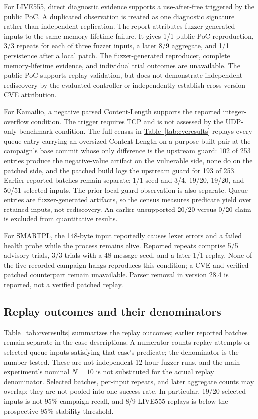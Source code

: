 \documentclass[final,5p,times,number]{elsarticle}
\newcommand{\namedref}[2]{\hyperref[#2]{#1~\ref*{#2}}}
\begin{document}
For LIVE555, direct diagnostic evidence supports a use-after-free triggered by the public PoC. A duplicated observation is treated as one diagnostic signature rather than independent replication. The report attributes fuzzer-generated inputs to the same memory-lifetime failure. It gives 1/1 public-PoC reproduction, 3/3 repeats for each of three fuzzer inputs, a later 8/9 aggregate, and 1/1 persistence after a local patch. The fuzzer-generated reproducer, complete memory-lifetime evidence, and individual trial outcomes are unavailable. The public PoC supports replay validation, but does not demonstrate independent rediscovery by the evaluated controller or independently establish cross-version CVE attribution.

For Kamailio, a negative parsed Content-Length supports the reported integer-overflow condition. The trigger requires TCP and is not assessed by the UDP-only benchmark condition. The full census in \namedref{Table}{tab:cveresults} replays every queue entry carrying an oversized Content-Length on a purpose-built pair at the campaign's base commit whose only difference is the upstream guard: 102 of 253 entries produce the negative-value artifact on the vulnerable side, none do on the patched side, and the patched build logs the upstream guard for 193 of 253. Earlier reported batches remain separate: 1/1 seed and 3/4, 19/20, 19/20, and 50/51 selected inputs. The prior local-guard observation is also separate. Queue entries are fuzzer-generated artifacts, so the census measures predicate yield over retained inputs, not rediscovery. An earlier unsupported 20/20 versus 0/20 claim is excluded from quantitative results. 

For SMARTPL, the 148-byte input reportedly causes lexer errors and a failed health probe while the process remains alive. Reported repeats comprise 5/5 advisory trials, 3/3 trials with a 48-message seed, and a later 1/1 replay. None of the five recorded campaign hangs reproduces this condition; a CVE and verified patched counterpart remain unavailable. Parser removal in version 28.4 is reported, not a verified patched replay.

\subsection{Replay outcomes and their denominators}
\namedref{Table}{tab:cveresults} summarizes the replay outcomes; earlier reported batches remain separate in the case descriptions. A numerator counts replay attempts or selected queue inputs satisfying that case's predicate; the denominator is the number tested. These are not independent 12-hour fuzzer runs, and the main experiment's nominal $N=10$ is not substituted for the actual replay denominator. Selected batches, per-input repeats, and later aggregate counts may overlap; they are not pooled into one success rate. In particular, 19/20 selected inputs is not 95\% campaign recall, and 8/9 LIVE555 replays is below the prospective 95\% stability threshold.
\end{document}
